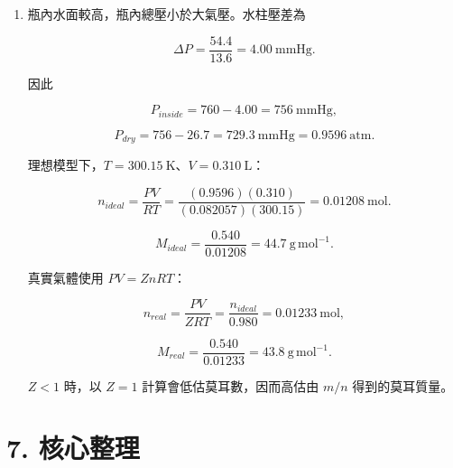 \documentclass[11pt,a4paper]{article}
\begin{document}
\begin{enumerate}
  \(H_2\) 的 \(1.00\ \mathrm{atm}\) 尺度需消耗 \(0.500\ \mathrm{atm}\) 尺度的 \(O_2\)，並生成 \(1.00\ \mathrm{atm}\) 尺度的水蒸氣。因此

  \[
  P_{H_2}=0,\quad P_{O_2}=0.500\ \mathrm{atm},
  \quad P_{H_2O}=1.00\ \mathrm{atm},
  \]

  \[
  P_t=1.50\ \mathrm{atm}.
  \]

  終態回到原溫度且水保持氣態，才可直接沿用這組分壓---莫耳數比例。
\item
  瓶內水面較高，瓶內總壓小於大氣壓。水柱壓差為

  \[
  \Delta P=\frac{54.4}{13.6}=4.00\ \mathrm{mmHg}.
  \]

  因此

  \[
  P_{inside}=760-4.00=756\ \mathrm{mmHg},
  \]

  \[
  P_{dry}=756-26.7=729.3\ \mathrm{mmHg}
  =0.9596\ \mathrm{atm}.
  \]

  理想模型下，\(T=300.15\ \mathrm K\)、\(V=0.310\ \mathrm L\)：

  \[
  n_{ideal}=\frac{PV}{RT}
  =\frac{(0.9596)(0.310)}{(0.082057)(300.15)}
  =0.01208\ \mathrm{mol}.
  \]

  \[
  M_{ideal}=\frac{0.540}{0.01208}=44.7\ \mathrm{g\,mol^{-1}}.
  \]

  真實氣體使用 \(PV=ZnRT\)：

  \[
  n_{real}=\frac{PV}{ZRT}=\frac{n_{ideal}}{0.980}
  =0.01233\ \mathrm{mol},
  \]

  \[
  M_{real}=\frac{0.540}{0.01233}=43.8\ \mathrm{g\,mol^{-1}}.
  \]

  \(Z<1\) 時，以 \(Z=1\) 計算會低估莫耳數，因而高估由 \(m/n\) 得到的莫耳質量。
\end{enumerate}

\section{7. 核心整理}\label{ux6838ux5fc3ux6574ux7406}
\end{document}
